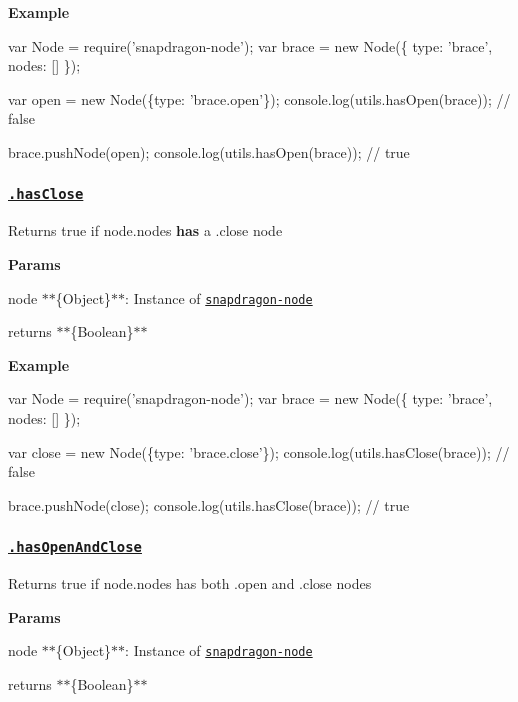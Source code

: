 {\bfseries Example}


\begin{DoxyCode}
var Node = require('snapdragon-node');
var brace = new Node(\{
  type: 'brace',
  nodes: []
\});

var open = new Node(\{type: 'brace.open'\});
console.log(utils.hasOpen(brace)); // false

brace.pushNode(open);
console.log(utils.hasOpen(brace)); // true
\end{DoxyCode}


\subsubsection*{\href{index.js#L663}{\tt .has\+Close}}

Returns true if {\ttfamily node.\+nodes} {\bfseries has} a {\ttfamily .close} node

{\bfseries Params}


\begin{DoxyItemize}
\item {\ttfamily node} $\ast$$\ast$\{Object\}$\ast$$\ast$\+: Instance of \href{https://github.com/jonschlinkert/snapdragon-node}{\tt snapdragon-\/node}
\item {\ttfamily returns} $\ast$$\ast$\{Boolean\}$\ast$$\ast$
\end{DoxyItemize}

{\bfseries Example}


\begin{DoxyCode}
var Node = require('snapdragon-node');
var brace = new Node(\{
  type: 'brace',
  nodes: []
\});

var close = new Node(\{type: 'brace.close'\});
console.log(utils.hasClose(brace)); // false

brace.pushNode(close);
console.log(utils.hasClose(brace)); // true
\end{DoxyCode}


\subsubsection*{\href{index.js#L697}{\tt .has\+Open\+And\+Close}}

Returns true if {\ttfamily node.\+nodes} has both {\ttfamily .open} and {\ttfamily .close} nodes

{\bfseries Params}


\begin{DoxyItemize}
\item {\ttfamily node} $\ast$$\ast$\{Object\}$\ast$$\ast$\+: Instance of \href{https://github.com/jonschlinkert/snapdragon-node}{\tt snapdragon-\/node}
\item {\ttfamily returns} $\ast$$\ast$\{Boolean\}$\ast$$\ast$
\end{DoxyItemize}

